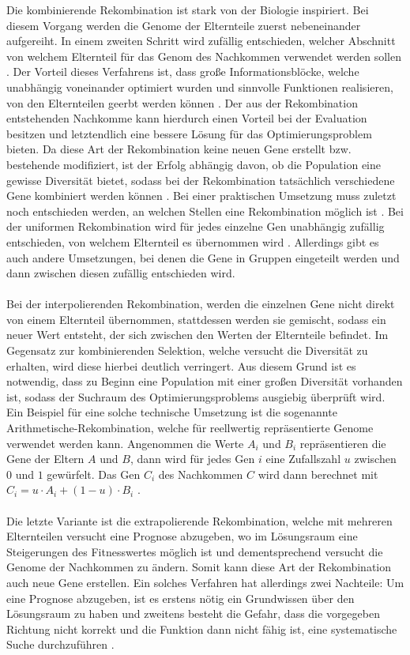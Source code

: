 Die kombinierende Rekombination ist stark von der Biologie inspiriert. Bei diesem Vorgang werden die Genome der Elternteile zuerst nebeneinander aufgereiht. In einem zweiten Schritt wird zufällig entschieden, welcher Abschnitt von welchem Elternteil für das Genom des Nachkommen verwendet werden sollen \cite{weicker2015evolutionare}. Der Vorteil dieses Verfahrens ist, dass große Informationsblöcke, welche unabhängig voneinander optimiert wurden und sinnvolle Funktionen realisieren, von den Elternteilen geerbt werden können \cite{russell2013kunstliche}. Der aus der Rekombination entstehenden Nachkomme kann hierdurch einen Vorteil bei der Evaluation besitzen und letztendlich eine bessere Lösung für das Optimierungsproblem bieten. Da diese Art der Rekombination keine neuen Gene erstellt bzw. bestehende modifiziert, ist der Erfolg abhängig davon, ob die Population eine gewisse Diversität bietet, sodass bei der Rekombination tatsächlich verschiedene Gene kombiniert werden können \cite{weicker2015evolutionare}. Bei einer praktischen Umsetzung muss zuletzt noch entschieden werden, an welchen Stellen eine Rekombination möglich ist \cite{rojas1996neural}. Bei der uniformen Rekombination wird  für jedes einzelne Gen unabhängig zufällig entschieden, von welchem Elternteil es übernommen wird \cite{weicker2015evolutionare}. Allerdings gibt es auch andere Umsetzungen, bei denen die Gene in Gruppen eingeteilt werden und dann zwischen diesen zufällig entschieden wird.
\\\\
Bei der interpolierenden Rekombination, werden die einzelnen Gene nicht direkt von einem Elternteil übernommen, stattdessen werden sie gemischt, sodass ein neuer Wert entsteht, der sich zwischen den Werten der Elternteile befindet. Im Gegensatz zur kombinierenden Selektion, welche versucht die Diversität zu erhalten, wird diese hierbei deutlich verringert. Aus diesem Grund ist es notwendig, dass zu Beginn eine Population mit einer großen Diversität vorhanden ist, sodass der Suchraum  des Optimierungsproblems ausgiebig überprüft wird. Ein Beispiel für eine solche technische Umsetzung ist die sogenannte Arithmetische-Rekombination, welche für reellwertig repräsentierte Genome verwendet werden kann. Angenommen die Werte $A_i$ und $B_i$ repräsentieren die Gene der Eltern $A$ und $B$, dann wird für jedes Gen $i$ eine Zufallszahl $u$ zwischen $0$ und $1$ gewürfelt. Das Gen $C_i$ des Nachkommen $C$ wird dann berechnet mit $C_i=u \cdot A_i + (1-u) \cdot B_i$ \cite{weicker2015evolutionare}.
\\\\
Die letzte Variante ist die extrapolierende Rekombination, welche mit mehreren Elternteilen versucht eine Prognose abzugeben, wo im Lösungsraum eine Steigerungen des Fitnesswertes möglich ist und dementsprechend versucht die Genome der Nachkommen zu ändern. Somit kann diese Art der Rekombination auch neue Gene erstellen. Ein solches Verfahren hat allerdings zwei Nachteile: Um eine Prognose abzugeben, ist es erstens nötig ein Grundwissen über den Lösungsraum zu haben und zweitens besteht die Gefahr, dass die vorgegeben Richtung nicht korrekt und die Funktion dann nicht fähig ist, eine systematische Suche durchzuführen \cite{weicker2015evolutionare}.   

